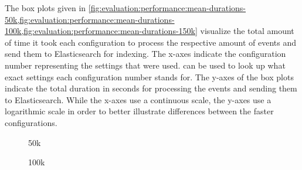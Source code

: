 The box plots given in \cref{fig:evaluation:performance:mean-durations-50k,fig:evaluation:performance:mean-durations-100k,fig:evaluation:performance:mean-durations-150k} visualize the total amount of time it took each configuration to process the respective amount of events and send them to Elasticsearch for indexing.
The x-axes indicate the configuration number representing the settings that were used.
 can be used to look up what exact settings each configuration number stands for.
The y-axes of the box plots indicate the total duration in seconds for processing the events and sending them to Elasticsearch.
While the x-axes use a continuous scale, the y-axes use a logarithmic scale in order to better illustrate differences between the faster configurations.

\begin{figure}[h]
        \caption{50k}
        \label{fig:evaluation:performance:mean-durations-50k}
\end{figure}

\begin{figure}[h]
        \caption{100k}
        \label{fig:evaluation:performance:mean-durations-100k}
\end{figure}

